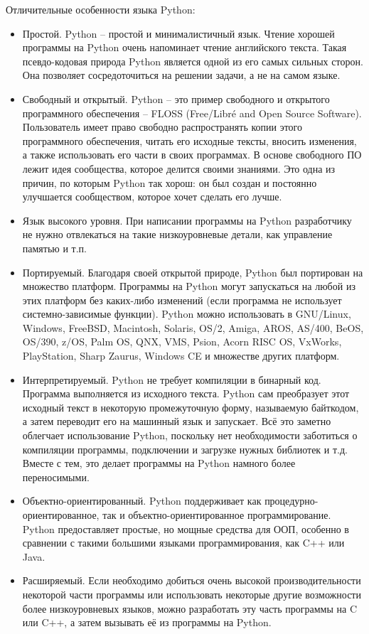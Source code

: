 Отличительные особенности языка Python:
\begin{itemize}
  \item Простой. Python – простой и минималистичный язык. Чтение хорошей программы на Python очень напоминает чтение английского текста. Такая псевдо-кодовая природа Python является одной из его самых сильных сторон. Она позволяет сосредоточиться на решении задачи, а не на самом языке.
  \item Свободный и открытый. Python – это пример свободного и открытого программного обеспечения – FLOSS (Free/Libré and Open Source Software). Пользователь имеет право свободно распространять копии этого программного обеспечения, читать его исходные тексты, вносить изменения, а также использовать его части в своих программах. В основе свободного ПО лежит идея сообщества, которое делится своими знаниями. Это одна из причин, по которым Python так хорош: он был создан и постоянно улучшается сообществом, которое хочет сделать его лучше.
  \item Язык высокого уровня. При написании программы на Python разработчику не нужно отвлекаться на такие низкоуровневые детали, как управление памятью и т.п.
  \item Портируемый. Благодаря своей открытой природе, Python был портирован на множество платформ. Программы на Python могут запускаться на любой из этих платформ без каких-либо изменений (если программа не использует системно-зависимые функции). Python можно использовать в GNU/Linux, Windows, FreeBSD, Macintosh, Solaris, OS/2, Amiga, AROS, AS/400, BeOS, OS/390, z/OS, Palm OS, QNX, VMS, Psion, Acorn RISC OS, VxWorks, PlayStation, Sharp Zaurus, Windows CE и множестве других платформ.
  \item Интерпретируемый. Python не требует компиляции в бинарный код. Программа выполняется из исходного текста. Python сам преобразует этот исходный текст в некоторую промежуточную форму, называемую байткодом, а затем переводит его на машинный язык и запускает. Всё это заметно облегчает использование Python, поскольку нет необходимости заботиться о компиляции программы, подключении и загрузке нужных библиотек и т.д. Вместе с тем, это делает программы на Python намного более переносимыми.
  \item Объектно-ориентированный. Python поддерживает как процедурно-ориентированное, так и объектно-ориентированное программирование. Python предоставляет простые, но мощные средства для ООП, особенно в сравнении с такими большими языками программирования, как C++ или Java.
  \item Расширяемый. Если необходимо добиться очень высокой производительности некоторой части программы или использовать некоторые другие возможности более низкоуровневых языков, можно разработать эту часть программы на C или C++, а затем вызывать её из программы на Python.

\end{itemize}
